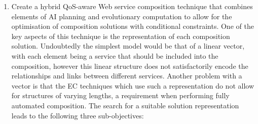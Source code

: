 \begin{enumerate}

  \item \label{obj:rep} Create a hybrid QoS-aware Web service composition technique that combines elements of AI planning and evolutionary computation to allow for the optimisation of composition solutions with conditional constraints. One of the key aspects of this technique is the representation of each composition solution. Undoubtedly the simplest model would be that of a linear vector, with each element being a service that should be included into the composition, however this linear structure does not satisfactorily encode the relationships and links between different services. Another problem with a vector is that the EC techniques which use such a representation do not allow for structures of varying lengths, a requirement when performing fully automated composition. The search for a suitable solution representation leads to the following three sub-objectives:
  

\end{enumerate}
